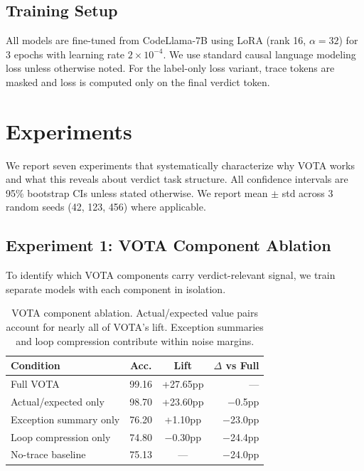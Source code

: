 \documentclass[11pt,a4paper]{article}
\begin{document}
\subsection{Training Setup}

All models are fine-tuned from CodeLlama-7B using LoRA (rank 16, $\alpha=32$) for 3 epochs with learning rate $2 \times 10^{-4}$. We use standard causal language modeling loss unless otherwise noted. For the label-only loss variant, trace tokens are masked and loss is computed only on the final verdict token.

\section{Experiments}
\label{sec:experiments}

We report seven experiments that systematically characterize why VOTA works and what this reveals about verdict task structure. All confidence intervals are 95\% bootstrap CIs unless stated otherwise. We report mean $\pm$ std across 3 random seeds (42, 123, 456) where applicable.

\subsection{Experiment 1: VOTA Component Ablation}
\label{sec:exp1}

To identify which VOTA components carry verdict-relevant signal, we train separate models with each component in isolation.

\begin{table}[t]
\centering
\small
\begin{tabular}{lccr}
\toprule
\textbf{Condition} & \textbf{Acc.} & \textbf{Lift} & \textbf{$\Delta$ vs Full} \\
\midrule
Full VOTA & 99.16 & +27.65pp & --- \\
Actual/expected only & 98.70 & +23.60pp & $-$0.5pp \\
Exception summary only & 76.20 & +1.10pp & $-$23.0pp \\
Loop compression only & 74.80 & $-$0.30pp & $-$24.4pp \\
\midrule
No-trace baseline & 75.13 & --- & $-$24.0pp \\
\bottomrule
\end{tabular}
\caption{VOTA component ablation. Actual/expected value pairs account for nearly all of VOTA's lift. Exception summaries and loop compression contribute within noise margins.}
\label{tab:component_ablation}
\end{table}
\end{document}
